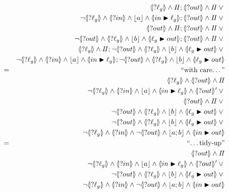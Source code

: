 \begin{eqnarray*}
  &&
     \LS{\ell_g} \land \Skip ; \LS{out} \land \Skip \lor{}
\\&& \lnot \LS{\ell_g}
           \land \LS{in} \land \ado a \land \LUPD{in}{\ell_g}
            ; \LS{out} \land \Skip\lor {}
\\&& \LS{out} \land \Skip ;\LS{out} \land \Skip\lor {}
\\&&\lnot \LS{out}
           \land \LS{\ell_g} \land \ado b \land \LUPD{\ell_g}{out} 
           ; \LS{out} \land \Skip \lor {}
\\&&
     \LS{\ell_g} \land \Skip 
     ; \lnot \LS{out}
       \land \LS{\ell_g} \land \ado b \land \LUPD{\ell_g}{out} \lor{}
\\&& \lnot \LS{\ell_g}
           \land \LS{in} \land \ado a \land \LUPD{in}{\ell_g} 
            ; \lnot \LS{out}
       \land \LS{\ell_g} \land \ado b \land \LUPD{\ell_g}{out}
\EQ{with care\dots}
\\&&\LS{\ell_g} \land\LS{out} \land \Skip
\\&& \lnot \LS{\ell_g}
           \land \LS{in} \land \ado a \land \LUPD{in}{\ell_g}
            \land \LSd{out} \lor {}
\\&& \LS{out} \land \Skip  \lor {}
\\&&\lnot \LS{out}
           \land \LS{\ell_g} \land \ado b \land \LUPD{\ell_g}{out}
           \lor {}
\\&& \lnot \LS{out}
       \land \LS{\ell_g} \land \ado b \land \LUPD{\ell_g}{out} \lor{}
\\&& \lnot \LS{\ell_g} \land \LS{in} \land \lnot\LS{out}
    \land \ado{a;b}\land \LUPD{in}{out}
\EQ{\ldots tidy-up}
\\&& \LS{out} \land \Skip
\\&& \lnot \LS{\ell_g}
           \land \LS{in} \land \ado a \land \LUPD{in}{\ell_g}
            \land \LSd{out} \lor {}
\\&& \lnot \LS{out}
       \land \LS{\ell_g} \land \ado b \land \LUPD{\ell_g}{out} \lor{}
\\&& \lnot \LS{\ell_g} \land \LS{in} \land \lnot\LS{out}
    \land \ado{a;b}\land \LUPD{in}{out}
\end{eqnarray*}